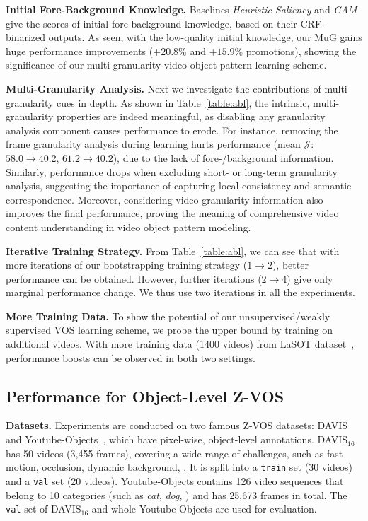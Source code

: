 \documentclass[10pt,twocolumn,letterpaper]{article}
\begin{document}
\noindent\textbf{Initial Fore-Background Knowledge.}
Baselines \textit{Heuristic Saliency} and \textit{CAM} give the scores of initial fore-background knowledge, based on their CRF-binarized outputs. As seen, with the low-quality initial knowledge, our MuG gains huge performance improvements ($+20.8\%$ and $+15.9\%$ promotions), showing the significance of our multi-granularity video object pattern learning scheme.

\noindent\textbf{Multi-Granularity Analysis.}
Next we  investigate the contributions of multi-granularity cues in depth. As shown in Table~\!\ref{table:abl}, the intrinsic, multi-granularity properties are indeed meaningful, as disabling any granularity analysis component causes performance to erode. For instance, removing the frame granularity analysis during learning hurts performance (mean $\mathcal{J}$: $\!58.0\!\rightarrow\!40.2$, $\!61.2\!\rightarrow\!40.2$), due to the lack of fore-/background information. Similarly, performance drops when excluding short- or long-term granularity analysis, suggesting the importance of capturing local consistency and semantic correspondence. Moreover, considering video granularity information also improves the final performance, proving the meaning of comprehensive video content understanding in video object pattern modeling.

\noindent\textbf{Iterative Training Strategy.}
From Table~\!\ref{table:abl}, we can see that with more iterations of our bootstrapping training strategy
($1\!\rightarrow\!2$), better performance can be obtained. However, further iterations ($2\!\rightarrow\!4$) give only marginal performance change. We thus use two iterations in all the experiments.

\noindent\textbf{More Training Data.} To show the potential of our unsupervised/weakly supervised VOS learning scheme, we probe the upper bound by training on additional videos. With more training data (1400 videos) from LaSOT dataset~\!\cite{Fan_2019_CVPR}, performance boosts can be observed in both two settings.

\vspace{-2pt}
\subsection{Performance for Object-Level Z-VOS}
\label{sec:OZVOS}
\vspace{-1pt}
\noindent\textbf{Datasets.} Experiments are conducted on two famous Z-VOS datasets: DAVIS~\!\cite{perazzi2016benchmark} and Youtube-Objects~\!\cite{prest2012learning}, which have pixel-wise, object-level annotations. DAVIS$_{16}$ has 50 videos (3,455 frames), covering a wide range of challenges, such as fast motion, occlusion, dynamic background, \etc. It is split into a \texttt{train} set (30 videos) and a \texttt{val} set (20 videos).
Youtube-Objects contains 126 video sequences that belong to 10 categories (such as \textit{cat}, \textit{dog}, \etc) and has 25,673 frames in total. The \texttt{val} set of DAVIS$_{16}$ and whole Youtube-Objects are used for evaluation.
\end{document}
